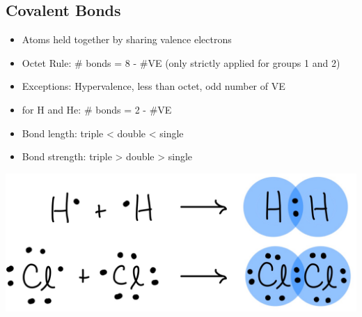 \subsection{Covalent Bonds}
\begin{minipage}{0.49\linewidth}
    \begin{itemize}[leftmargin=0.20cm, itemsep=0.05pt]
        \item Atoms held together by sharing valence electrons
        \item Octet Rule: \# bonds = 8 - \#VE (only strictly applied for groups 1 and 2)
        \item Exceptions: Hypervalence, less than octet, odd number of VE
        \item for H and He: \# bonds = 2 - \#VE
    \end{itemize}
    
\end{minipage}
\begin{minipage}{0.49\linewidth}
    \begin{itemize}[leftmargin=0.20cm, itemsep=0.05pt]
        \item Bond length: triple < double < single
        \item Bond strength: triple > double > single
    \end{itemize}
    \begin{center}
            \includegraphics[width = 0.7\linewidth]{images/Covalent_Bonds.jpeg}
    \end{center}
\end{minipage}